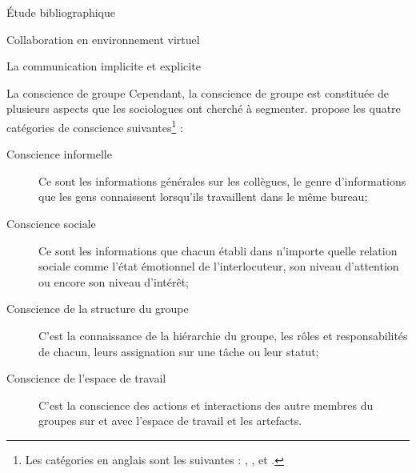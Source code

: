 \documentclass[myfrancais,ngerman,english,frenchb]{mythesis}
\begin{document}
\begin{mychapter}{Étude bibliographique}
\begin{mysection}{Collaboration en environnement virtuel}
\begin{mysubsection}{La communication implicite et explicite}
\begin{mysubsubsection}{La conscience de groupe}
					Cependant, la conscience de groupe est constituée de plusieurs aspects que les sociologues ont cherché à segmenter.
					 propose les quatre catégories de conscience suivantes\footnote{Les catégories en anglais sont les suivantes : , ,  et .} :
					\begin{description}
						\item[Conscience informelle] Ce sont les informations générales sur les collègues, le genre d'informations que les gens connaissent lorsqu'ils travaillent dans le même bureau;
						\item[Conscience sociale] Ce sont les informations que chacun établi dans n'importe quelle relation sociale comme l'état émotionnel de l'interlocuteur, son niveau d'attention ou encore son niveau d'intérêt;
						\item[Conscience de la structure du groupe] C'est la connaissance de la hiérarchie du groupe, les rôles et responsabilités de chacun, leurs assignation sur une tâche ou leur statut;
						\item[Conscience de l'espace de travail] C'est la conscience des actions et interactions des autre membres du groupes sur et avec l'espace de travail et les artefacts.
					\end{description}


\end{mysubsubsection}
\end{mysubsection}
\end{mysection}
\end{mychapter}
\end{document}
